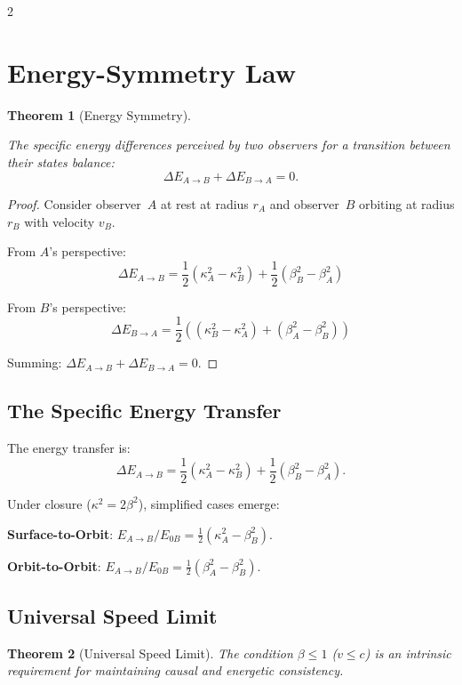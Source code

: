 \documentclass[10pt, a4paper]{article}
\newtheorem{theorem}{Theorem}[section]
\begin{document}
\begin{multicols}{2}

\section{Energy-Symmetry Law}
\hypertarget{sec:energy-symmetry}{}\label{sec:energy-symmetry}

\begin{theorem}[Energy Symmetry]
\hypertarget{thm:conservation}{}\label{thm:conservation}
The specific energy differences perceived by two observers for a transition between their states balance:
\begin{equation}
\Delta E_{A \to B} + \Delta E_{B \to A} = 0.
\end{equation}
\end{theorem}

\begin{proof}
Consider observer~$A$ at rest at radius $r_A$ and observer~$B$ orbiting at radius $r_B$ with velocity $v_B$.

From $A$'s perspective:
\begin{equation}
\boxed{\Delta E_{A \to B} = \frac{1}{2}(\kappa_A^2 - \kappa_B^2) + \frac{1}{2}(\beta_B^2 - \beta_A^2)}
\end{equation}

From $B$'s perspective:
\[
\Delta E_{B \to A} = \frac{1}{2}((\kappa_B^2 - \kappa_A^2) + (\beta_A^2 - \beta_B^2))
\]

Summing: $\Delta E_{A \to B} + \Delta E_{B \to A} = 0$.
\end{proof}

\subsection{The Specific Energy Transfer}
The energy transfer is:
\[
\Delta E_{A \to B} = \frac{1}{2}(\kappa_A^2 - \kappa_B^2) + \frac{1}{2}(\beta_B^2 - \beta_A^2).
\]

Under closure ($\kappa^2=2\beta^2$), simplified cases emerge:

\textbf{Surface-to-Orbit}: $E_{A\to B}/E_{0B} = \frac{1}{2}(\kappa_A^2 - \beta_B^2)$.

\textbf{Orbit-to-Orbit}: $E_{A\to B}/E_{0B} = \frac{1}{2}(\beta_A^2 - \beta_B^2)$.

\subsection{Universal Speed Limit}
\begin{theorem}[Universal Speed Limit]
The condition $\beta \leq 1$ ($v \leq c$) is an intrinsic requirement for maintaining causal and energetic consistency.
\end{theorem}


\end{multicols}
\end{document}

